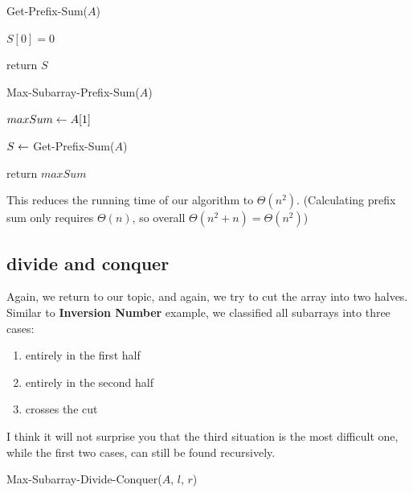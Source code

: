 \documentclass[11pt, a4paper]{COMP3711}
\begin{document}
\begin{spacing}{1.5}
    \vspace{0.2in}
    \begin{algorithm}
        \caption{Get-Prefix-Sum($A$)}
        $S[0]=0$

        return $S$
    \end{algorithm}

    \begin{algorithm}[H]
        \caption{Max-Subarray-Prefix-Sum($A$)}
        $maxSum \leftarrow A[1]$ 

        $S\leftarrow$ Get-Prefix-Sum($A$) \qquad {}

        return $maxSum$
    \end{algorithm}

    This reduces the running time of our algorithm to $\Theta(n^2)$.
    (Calculating prefix sum only requires $\Theta(n)$, 
    so overall $\Theta(n^2+n)=\Theta(n^2)$)

    \subsection{divide and conquer}

    Again, we return to our topic, and again, we try to cut 
    the array into two halves. Similar to {\bf Inversion Number}
    example, we classified all subarrays into three cases:
    \begin{enumerate}
        \item entirely in the first half
        \item entirely in the second half
        \item crosses the cut
    \end{enumerate}
    I think it will not surprise you that the third situation is 
    the most difficult one, while the first two cases, can still 
    be found recursively.

    \begin{algorithm}
        \caption{Max-Subarray-Divide-Conquer($A$, $l$, $r$)}



\end{algorithm}
\end{spacing}
\end{document}
